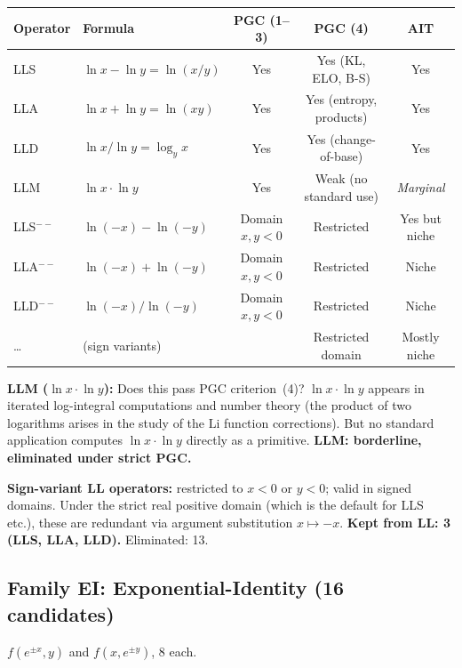 \documentclass[11pt]{article}
\begin{document}
\begin{center}
\begin{tabular}{llccc}
\toprule
Operator & Formula & PGC (1--3) & PGC (4) & AIT \\
\midrule
LLS & $\ln x - \ln y = \ln(x/y)$ & Yes & Yes (KL, ELO, B-S) & Yes \\
LLA & $\ln x + \ln y = \ln(xy)$ & Yes & Yes (entropy, products) & Yes \\
LLD & $\ln x / \ln y = \log_y x$ & Yes & Yes (change-of-base) & Yes \\
LLM & $\ln x \cdot \ln y$        & Yes & Weak (no standard use) & \emph{Marginal} \\
LLS$^{--}$ & $\ln(-x)-\ln(-y)$   & Domain $x,y<0$ & Restricted & Yes but niche \\
LLA$^{--}$ & $\ln(-x)+\ln(-y)$   & Domain $x,y<0$ & Restricted & Niche \\
LLD$^{--}$ & $\ln(-x)/\ln(-y)$   & Domain $x,y<0$ & Restricted & Niche \\
\ldots & (sign variants) & & Restricted domain & Mostly niche \\
\bottomrule
\end{tabular}
\end{center}

\textbf{LLM ($\ln x \cdot \ln y$):} Does this pass PGC criterion~(4)?
$\ln x \cdot \ln y$ appears in iterated log-integral computations and number theory
(the product of two logarithms arises in the study of the $\mathrm{Li}$ function corrections).
But no standard application computes $\ln x \cdot \ln y$ directly as a primitive.
\textbf{LLM: borderline, eliminated under strict PGC.}

\textbf{Sign-variant LL operators:} restricted to $x < 0$ or $y < 0$; valid in signed domains.
Under the strict real positive domain (which is the default for LLS etc.), these
are redundant via argument substitution $x \mapsto -x$.
\textbf{Kept from LL: 3 (LLS, LLA, LLD).}
Eliminated: 13.

\subsection{Family EI: Exponential-Identity (16 candidates)}

$f(e^{\pm x}, y)$ and $f(x, e^{\pm y})$, 8 each.
\end{document}
